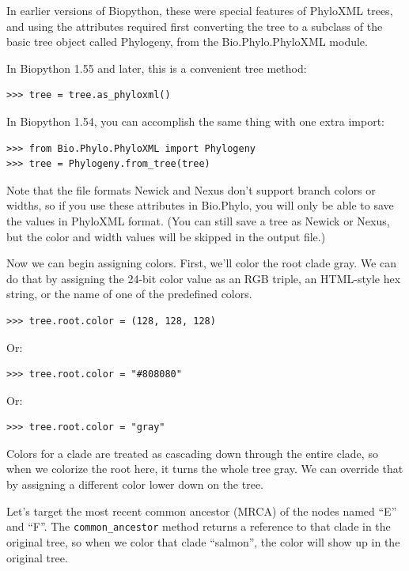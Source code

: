 \documentclass{report}
\begin{document}
In earlier versions of Biopython, these were special features of PhyloXML trees, and
using the attributes required first converting the tree to a subclass of the basic tree
object called Phylogeny, from the Bio.Phylo.PhyloXML module.

In Biopython 1.55 and later, this is a convenient tree method:

\begin{verbatim}
>>> tree = tree.as_phyloxml()
\end{verbatim}

In Biopython 1.54, you can accomplish the same thing with one extra import:

\begin{verbatim}
>>> from Bio.Phylo.PhyloXML import Phylogeny
>>> tree = Phylogeny.from_tree(tree)
\end{verbatim}

Note that the file formats Newick and Nexus don't support branch colors or widths, so
if you use these attributes in Bio.Phylo, you will only be able to save the values in
PhyloXML format. (You can still save a tree as Newick or Nexus, but the color and width
values will be skipped in the output file.)

Now we can begin assigning colors.
First, we'll color the root clade gray.  We can do that by assigning the 24-bit color
value as an RGB triple, an HTML-style hex string, or the name of one of the predefined
colors.

\begin{verbatim}
>>> tree.root.color = (128, 128, 128)
\end{verbatim}

Or:

\begin{verbatim}
>>> tree.root.color = "#808080"
\end{verbatim}

Or:

\begin{verbatim}
>>> tree.root.color = "gray"
\end{verbatim}

Colors for a clade are treated as cascading down through the entire clade, so when we colorize
the root here, it turns the whole tree gray.  We can override that by assigning a different
color lower down on the tree.

Let's target the most recent common ancestor (MRCA) of the nodes named ``E'' and ``F''.  The
\verb|common_ancestor| method returns a reference to that clade in the original tree, so when
we color that clade ``salmon'', the color will show up in the original tree.
\end{document}
